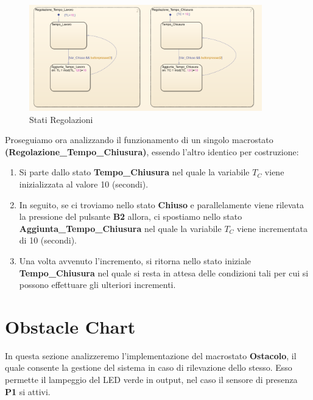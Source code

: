             \begin{figure}[H]
                \centering
                \includegraphics[width=0.9\textwidth]{figures/tuning.png}
                \caption{Stati Regolazioni}
                \label{tuning}
            \end{figure}

            \noindent Proseguiamo ora analizzando il funzionamento di un singolo macrostato \textbf{(Regolazione\_Tempo\_Chiusura)}, essendo l'altro identico per costruzione:

            \begin{enumerate}
                \item Si parte dallo stato \textbf{Tempo\_Chiusura} nel quale la variabile \textbf{$T_C$} viene inizializzata al valore 10 (secondi).
                
                \item In seguito, se ci troviamo nello stato \textbf{Chiuso} e parallelamente viene rilevata la pressione del pulsante \textbf{B2} allora, ci spostiamo nello stato \textbf{Aggiunta\_Tempo\_Chiusura} nel quale la variabile $T_C$ viene incrementata di 10 (secondi).
                
                \item Una volta avvenuto l'incremento, si ritorna nello stato iniziale \textbf{Tempo\_Chiusura} nel quale si resta in attesa delle condizioni tali per cui si possono effettuare gli ulteriori incrementi.
            \end{enumerate}


    \section{Obstacle Chart}
        In questa sezione analizzeremo l'implementazione del macrostato \textbf{Ostacolo}, il quale consente la gestione del sistema in caso di rilevazione dello stesso. Esso permette il lampeggio del LED verde in output, nel caso il sensore di presenza \textbf{P1} si attivi.

